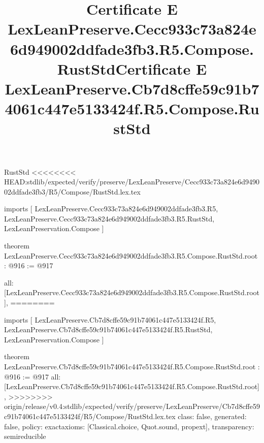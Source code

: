 \begin{lexlean}{RustStd}
<<<<<<<< HEAD:stdlib/expected/verify/preserve/LexLeanPreserve/Cecc933c73a824e6d949002ddfade3fb3/R5/Compose/RustStd.lex.tex
\title{Certificate E LexLeanPreserve.Cecc933c73a824e6d949002ddfade3fb3.R5.Compose.RustStd}
\begin{coremodule}
imports [
  LexLeanPreserve.Cecc933c73a824e6d949002ddfade3fb3.R5,
  LexLeanPreserve.Cecc933c73a824e6d949002ddfade3fb3.R5.RustStd,
  LexLeanPreservation.Compose
]

theorem LexLeanPreserve.Cecc933c73a824e6d949002ddfade3fb3.R5.Compose.RustStd.root : @916 := @917 {
  all: [LexLeanPreserve.Cecc933c73a824e6d949002ddfade3fb3.R5.Compose.RustStd.root],
========
\title{Certificate E LexLeanPreserve.Cb7d8cffe59c91b74061c447e5133424f.R5.Compose.RustStd}
\begin{coremodule}
imports [
  LexLeanPreserve.Cb7d8cffe59c91b74061c447e5133424f.R5,
  LexLeanPreserve.Cb7d8cffe59c91b74061c447e5133424f.R5.RustStd,
  LexLeanPreservation.Compose
]

theorem LexLeanPreserve.Cb7d8cffe59c91b74061c447e5133424f.R5.Compose.RustStd.root : @916 := @917 {
  all: [LexLeanPreserve.Cb7d8cffe59c91b74061c447e5133424f.R5.Compose.RustStd.root],
>>>>>>>> origin/release/v0.4:stdlib/expected/verify/preserve/LexLeanPreserve/Cb7d8cffe59c91b74061c447e5133424f/R5/Compose/RustStd.lex.tex
  class: false,
  generated: false,
  policy: exact{axioms: [Classical.choice, Quot.sound, propext]},
  transparency: semireducible
}


\end{coremodule}}
\end{coremodule}
\end{lexlean}
